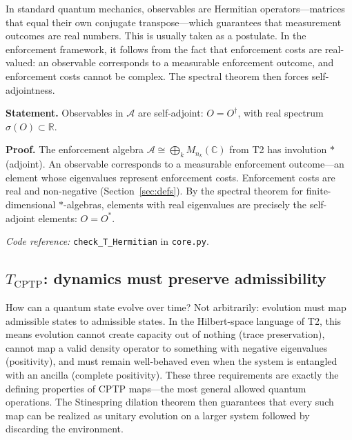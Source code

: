 \documentclass[11pt]{article}
\newcommand{\coderef}[2]{\smallskip\noindent\textit{Code reference:} \texttt{#1} in \texttt{#2}.}
\begin{document}
In standard quantum mechanics, observables are Hermitian operators---matrices that equal their own conjugate transpose---which guarantees that measurement outcomes are real numbers.  This is usually taken as a postulate.  In the enforcement framework, it follows from the fact that enforcement costs are real-valued: an observable corresponds to a measurable enforcement outcome, and enforcement costs cannot be complex.  The spectral theorem then forces self-adjointness.

\begin{tcolorbox}[apfbox, title={$T_{\mathrm{Hermitian}}$: Hermitian Observables}]
\textbf{Statement.}  Observables in $\mathcal{A}$ are self-adjoint: $O = O^\dagger$, with real spectrum $\sigma(O) \subset \mathbb{R}$.

\smallskip\noindent\textbf{Proof.}  The enforcement algebra $\mathcal{A} \cong \bigoplus_k M_{n_k}(\mathbb{C})$ from T2 has involution $*$ (adjoint).  An observable corresponds to a measurable enforcement outcome---an element whose eigenvalues represent enforcement costs.  Enforcement costs are real and non-negative (Section~\ref{sec:defs}).  By the spectral theorem for finite-dimensional $*$-algebras, elements with real eigenvalues are precisely the self-adjoint elements: $O = O^*$.

\coderef{check\_T\_Hermitian}{core.py}
\end{tcolorbox}


\subsection{\texorpdfstring{$T_{\mathrm{CPTP}}$}{T CPTP}: dynamics must preserve admissibility}

How can a quantum state evolve over time?  Not arbitrarily: evolution must map admissible states to admissible states.  In the Hilbert-space language of T2, this means evolution cannot create capacity out of nothing (trace preservation), cannot map a valid density operator to something with negative eigenvalues (positivity), and must remain well-behaved even when the system is entangled with an ancilla (complete positivity).  These three requirements are exactly the defining properties of CPTP maps---the most general allowed quantum operations.  The Stinespring dilation theorem then guarantees that every such map can be realized as unitary evolution on a larger system followed by discarding the environment.
\end{document}
